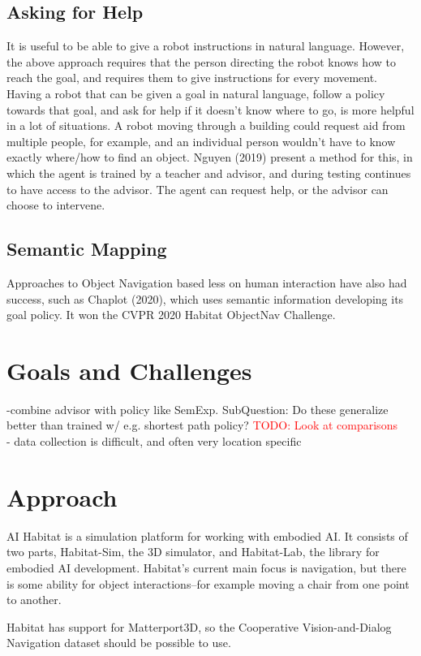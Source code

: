 \documentclass{article}
\begin{document}
\subsection{Asking for Help}
It is useful to be able to give a robot instructions in natural language. However, the above approach requires that the person directing the robot knows how to reach the goal, and requires them to give instructions for every movement. Having a robot that can be given a goal in natural language, follow a policy towards that goal, and ask for help if it doesn't know where to go, is more helpful in a lot of situations. A robot moving through a building could request aid from multiple people, for example, and an individual person wouldn't have to know exactly where/how to find an object. Nguyen (2019) present a method for this\cite{Nguyen_2019_CVPR}, in which the agent is trained by a teacher and advisor, and during testing continues to have access to the advisor. The agent can request help, or the advisor can choose to intervene. 

\subsection{Semantic Mapping}
Approaches to Object Navigation based less on human interaction have also had success, such as Chaplot (2020), which uses semantic information developing its goal policy\cite{semexp}. It won the CVPR 2020 Habitat ObjectNav Challenge.

\section{Goals and Challenges}
-combine advisor with policy like SemExp. SubQuestion: Do these generalize better than trained w/ e.g. shortest path policy? \textcolor{red}{TODO: Look at comparisons}\\
- data collection is difficult, and often very location specific

\section{Approach}
AI Habitat is a simulation platform for working with embodied AI\cite{habitat19iccv}. It consists of two parts, Habitat-Sim, the 3D simulator, and Habitat-Lab, the library for embodied AI development. Habitat's current main focus is navigation, but there is some ability for object interactions--for example moving a chair from one point to another. 

Habitat has support for Matterport3D, so the Cooperative Vision-and-Dialog Navigation dataset should be possible to use. 




\end{document}
